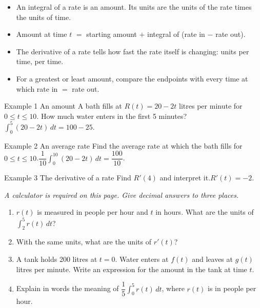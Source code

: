 \documentclass[11pt]{article}
\begin{document}

\begin{ideabox}
\begin{itemize}[leftmargin=*,itemsep=2pt,topsep=2pt]
  \item An integral of a rate is an amount. Its units are the units of the rate times the units of time.
  \item Amount at time $t$ $=$ starting amount $+$ integral of (rate in $-$ rate out).
  \item The derivative of a rate tells how fast the rate itself is changing: units per time, per time.
  \item For a greatest or least amount, compare the endpoints with every time at which rate in $=$ rate out.
\end{itemize}
\end{ideabox}

\begin{example}{Example 1 \textperiodcentered{} An amount}
A bath fills at $R(t)=20-2t$ litres per minute for $0\le t\le10$. How much water enters in the first 5 minutes?\soln $\displaystyle\int_{0}^{5}(20-2t)\,dt=100-25$.
\end{example}

\begin{example}{Example 2 \textperiodcentered{} An average rate}
Find the average rate at which the bath fills for $0\le t\le10$.\soln $\dfrac{1}{10}\displaystyle\int_{0}^{10}(20-2t)\,dt=\dfrac{100}{10}$.
\end{example}

\begin{example}{Example 3 \textperiodcentered{} The derivative of a rate}
Find $R'(4)$ and interpret it.\soln $R'(t)=-2$.
\end{example}

\newpage
{}
\emph{A calculator is required on this page. Give decimal answers to three places.}
\begin{enumerate}[leftmargin=*,itemsep=2pt]
  \item $r(t)$ is measured in people per hour and $t$ in hours. What are the units of $\displaystyle\int_{2}^{5}r(t)\,dt$?\work{2.3cm}
  \item With the same units, what are the units of $r'(t)$?\work{2.3cm}
  \item A tank holds 200 litres at $t=0$. Water enters at $f(t)$ and leaves at $g(t)$ litres per minute. Write an expression for the amount in the tank at time $t$.\work{2.3cm}
  \item Explain in words the meaning of $\dfrac15\displaystyle\int_{0}^{5}r(t)\,dt$, where $r(t)$ is in people per hour.\work{2.3cm}
\end{enumerate}
\end{document}

